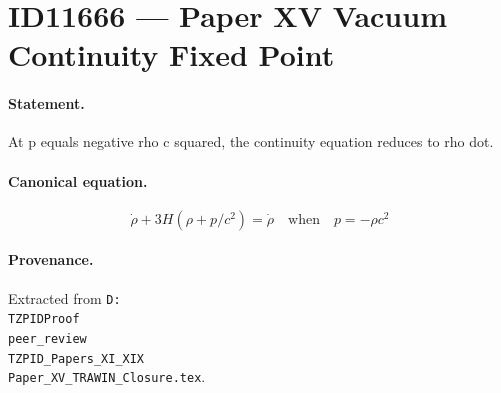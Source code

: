\section*{ID11666 --- Paper XV Vacuum Continuity Fixed Point}

\paragraph{Statement.}
At p equals negative rho c squared, the continuity equation reduces to rho dot.

\paragraph{Canonical equation.}
\[
\dot\rho+3H(\rho+p/c^2)=\dot\rho\quad\mathrm{when}\quad p=-\rho c^2
\]

\paragraph{Provenance.}
Extracted from \texttt{D:\\TZPIDProof\\peer\_review\\TZPID\_Papers\_XI\_XIX\\Paper\_XV\_TRAWIN\_Closure.tex}.
